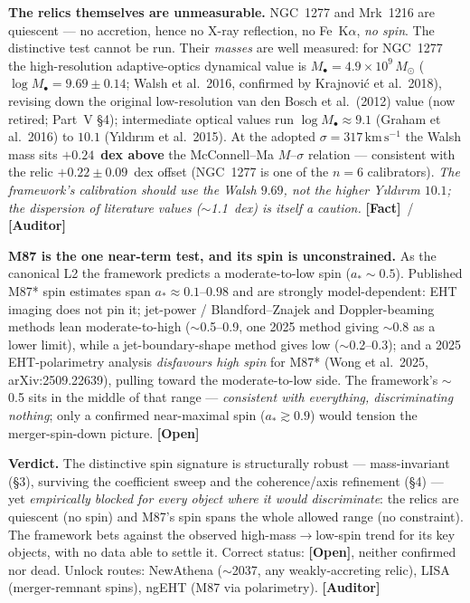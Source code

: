 \documentclass[11pt]{article}
\newcommand{\Fact}{\textbf{\textcolor{green!45!black}{[Fact]}}}
\newcommand{\Open}{\textbf{\textcolor{gray!10!black}{[Open]}}}
\newcommand{\Auditor}{\textbf{\textcolor{teal!55!black}{[Auditor]}}}
\newcommand{\msun}{M_\odot}
\begin{document}
\textbf{The relics themselves are unmeasurable.} NGC~1277 and Mrk~1216 are quiescent --- no accretion, hence no X-ray reflection, no Fe~K$\alpha$, \emph{no spin}. The distinctive test cannot be run. Their \emph{masses} are well measured: for NGC~1277 the high-resolution adaptive-optics dynamical value is $M_\bullet=4.9\times10^{9}\,\msun$ ($\log M_\bullet=9.69\pm0.14$; Walsh et al.\ 2016, confirmed by Krajnovi\'c et al.\ 2018), revising down the original low-resolution van den Bosch et al.\ (2012) value (now retired; Part~V \S4); intermediate optical values run $\log M_\bullet\!\approx\!9.1$ (Graham et al.\ 2016) to $10.1$ (Y\i ld\i r\i m et al.\ 2015). At the adopted $\sigma=317\,\mathrm{km\,s^{-1}}$ the Walsh mass sits $\mathbf{+0.24}$~\textbf{dex above} the McConnell--Ma $M$--$\sigma$ relation --- consistent with the relic $+0.22\pm0.09$~dex offset (NGC~1277 is one of the $n=6$ calibrators). \emph{The framework's calibration should use the Walsh $9.69$, not the higher Y\i ld\i r\i m $10.1$; the dispersion of literature values ($\sim$1.1~dex) is itself a caution.} \Fact\ / \Auditor

\textbf{M87 is the one near-term test, and its spin is unconstrained.} As the canonical L2 the framework predicts a moderate-to-low spin ($a_\ast\!\sim\!0.5$). Published M87* spin estimates span $a_\ast\!\approx\!0.1$--$0.98$ and are strongly model-dependent: EHT imaging does not pin it; jet-power / Blandford--Znajek and Doppler-beaming methods lean moderate-to-high ($\sim$0.5--0.9, one 2025 method giving $\sim$0.8 as a lower limit), while a jet-boundary-shape method gives low ($\sim$0.2--0.3); and a 2025 EHT-polarimetry analysis \emph{disfavours high spin} for M87* (Wong et al.\ 2025, arXiv:2509.22639), pulling toward the moderate-to-low side. The framework's $\sim$0.5 sits in the middle of that range --- \emph{consistent with everything, discriminating nothing}; only a confirmed near-maximal spin ($a_\ast\!\gtrsim\!0.9$) would tension the merger-spin-down picture. \Open

\textbf{Verdict.} The distinctive spin signature is structurally robust --- mass-invariant (\S3), surviving the coefficient sweep and the coherence/axis refinement (\S4) --- yet \emph{empirically blocked for every object where it would discriminate}: the relics are quiescent (no spin) and M87's spin spans the whole allowed range (no constraint). The framework bets against the observed high-mass$\to$low-spin trend for its key objects, with no data able to settle it. Correct status: \Open, neither confirmed nor dead. Unlock routes: NewAthena ($\sim$2037, any weakly-accreting relic), LISA (merger-remnant spins), ngEHT (M87 via polarimetry). \Auditor
\end{document}
